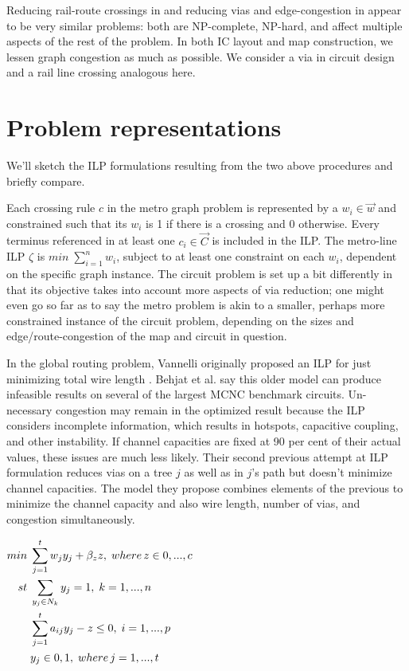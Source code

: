 \documentclass[twocolumn]{article}
\begin{document}
Reducing rail-route crossings in \cite{asquith} and reducing vias and edge-congestion
in \cite{behjat} appear to be very similar problems: both are NP-complete, NP-hard, and affect multiple
aspects of the rest of the problem. In both IC layout and map construction,
we lessen graph congestion as much as possible. We consider a via in circuit design and a rail line crossing
analogous here.

\section*{Problem representations}

We'll sketch the ILP formulations resulting from the two above procedures and briefly compare.

Each crossing rule $c$ in the metro graph problem is represented by a $w_i \in \vec{w}$ and constrained
such that its $w_i$ is 1 if there is a crossing and 0 otherwise.
Every terminus referenced in at least one $c_i \in \vec{C}$ is included in the ILP.
The metro-line ILP $\zeta$ is $min \; \sum\limits^{n}_{i=1}w_i$, subject to at least
one constraint on each $w_i$, dependent on the specific graph instance. The circuit problem is set up a bit
differently in that its objective takes into account more aspects of via reduction; one might even go so
far as to say the metro problem is akin to a smaller, perhaps more constrained instance of the
circuit problem, depending on the sizes and edge/route-congestion of the map and circuit in question.

In the global routing problem, Vannelli originally proposed an ILP for just minimizing total wire length
\cite{Vannelli}. Behjat et al.\cite{behjat} say this older model can
produce infeasible results on several of the largest MCNC\cite{mcnc} benchmark circuits.
Un-necessary congestion may remain in the optimized result because the ILP considers
incomplete information, which results in hotspots, capacitive coupling, and other instability. If channel
capacities are fixed at 90 per cent of their actual values, these issues are much less likely.
Their second previous attempt at ILP formulation reduces vias on a tree $j$ as well as in $j$'s path but
doesn't minimize channel capacities. The model they propose combines elements of the previous to
minimize the channel capacity and also wire length, number of vias, and congestion simultaneously.

$
\begin{aligned}
    min \; & \sum\limits^{t}_{j=1}w_{j}y_{j} + \beta_{z}z, \; where \, z \in {0, ..., c} \\
    st \; & \sum\limits_{y_{j} \in N_{k}}y_j = 1, \; k = {1, ..., n} \\
    & \sum\limits^{t}_{j=1}a_{ij}y_{j} - z \leq 0, \; i = {1, ..., p} \\
    & y_j \in {0,1}, \; where \, j = {1, ..., t} \\
\end{aligned}
    \belowdisplayskip=0pt
    \abovedisplayskip=0pt
    \setlength{\parskip}{0cm}
$
\end{document}
